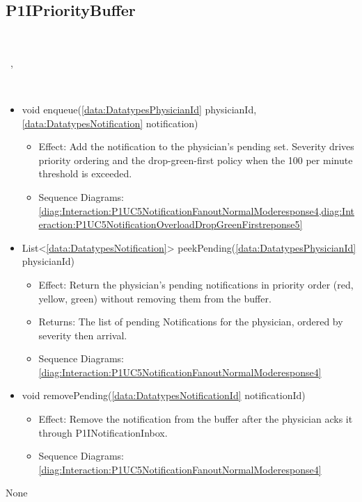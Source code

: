   \subsection{P1IPriorityBuffer}\label{int:InterfacesP1IPriorityBuffer}
    \begin{description}
      \item[Provided by:] \iconcomponent{}~
      \item[Required by:] \iconcomponent{}~, \iconcomponent{}~ 
      \item[Operations:] ~
    \begin{itemize}[noitemsep,nolistsep,leftmargin=-.25cm]
      \item \textsf{void enqueue(\ref{data:DatatypesPhysicianId} physicianId, \ref{data:DatatypesNotification} notification)}
        \begin{itemize}[noitemsep,nolistsep]
           \item Effect: Add the notification to the physician's pending set. Severity drives priority ordering and the drop-green-first policy when the 100 per minute threshold is exceeded. 
           \item Sequence Diagrams: \cref{diag:Interaction:P1UC5NotificationFanoutNormalModeresponse4,diag:Interaction:P1UC5NotificationOverloadDropGreenFirstreponse5}
        \end{itemize}
      \item \textsf{List\textless{}\ref{data:DatatypesNotification}\textgreater{} peekPending(\ref{data:DatatypesPhysicianId} physicianId)}
        \begin{itemize}[noitemsep,nolistsep]
           \item Effect: Return the physician's pending notifications in priority order (red, yellow, green) without removing them from the buffer. 
           \item Returns: The list of pending Notifications for the physician, ordered by severity then arrival.
           \item Sequence Diagrams: \cref{diag:Interaction:P1UC5NotificationFanoutNormalModeresponse4}
        \end{itemize}
      \item \textsf{void removePending(\ref{data:DatatypesNotificationId} notificationId)}
        \begin{itemize}[noitemsep,nolistsep]
           \item Effect: Remove the notification from the buffer after the physician acks it through P1INotificationInbox. 
           \item Sequence Diagrams: \cref{diag:Interaction:P1UC5NotificationFanoutNormalModeresponse4}
        \end{itemize}
    \end{itemize}
      \item[Diagrams:] None
    \end{description}

